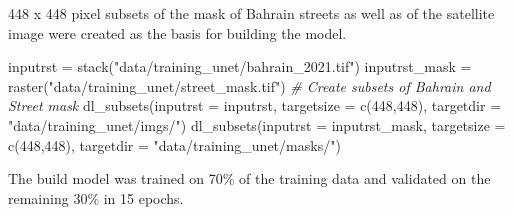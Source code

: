 \documentclass[
]{article}
\newenvironment{Shaded}{\begin{snugshade}}{\end{snugshade}}
\newcommand{\AttributeTok}[1]{\textcolor[rgb]{0.77,0.63,0.00}{#1}}
\newcommand{\CommentTok}[1]{\textcolor[rgb]{0.56,0.35,0.01}{\textit{#1}}}
\newcommand{\ControlFlowTok}[1]{\textcolor[rgb]{0.13,0.29,0.53}{\textbf{#1}}}
\newcommand{\DecValTok}[1]{\textcolor[rgb]{0.00,0.00,0.81}{#1}}
\newcommand{\FunctionTok}[1]{\textcolor[rgb]{0.00,0.00,0.00}{#1}}
\newcommand{\NormalTok}[1]{#1}
\newcommand{\OtherTok}[1]{\textcolor[rgb]{0.56,0.35,0.01}{#1}}
\newcommand{\SpecialCharTok}[1]{\textcolor[rgb]{0.00,0.00,0.00}{#1}}
\newcommand{\StringTok}[1]{\textcolor[rgb]{0.31,0.60,0.02}{#1}}
\begin{document}
\begin{Shaded}
\end{Shaded}

448 x 448 pixel subsets of the mask of Bahrain streets as well as of the
satellite image were created as the basis for building the model.

\begin{Shaded}
\begin{Highlighting}[]
\NormalTok{inputrst }\OtherTok{=} \FunctionTok{stack}\NormalTok{(}\StringTok{"data/training\_unet/bahrain\_2021.tif"}\NormalTok{)}
\NormalTok{inputrst\_mask }\OtherTok{=} \FunctionTok{raster}\NormalTok{(}\StringTok{"data/training\_unet/street\_mask.tif"}\NormalTok{)}
\CommentTok{\# Create subsets of Bahrain and Street mask}
\FunctionTok{dl\_subsets}\NormalTok{(}\AttributeTok{inputrst =}\NormalTok{ inputrst, }\AttributeTok{targetsize =} \FunctionTok{c}\NormalTok{(}\DecValTok{448}\NormalTok{,}\DecValTok{448}\NormalTok{), }
           \AttributeTok{targetdir =} \StringTok{"data/training\_unet/imgs/"}\NormalTok{)}
\FunctionTok{dl\_subsets}\NormalTok{(}\AttributeTok{inputrst =}\NormalTok{ inputrst\_mask, }\AttributeTok{targetsize =} \FunctionTok{c}\NormalTok{(}\DecValTok{448}\NormalTok{,}\DecValTok{448}\NormalTok{), }
           \AttributeTok{targetdir =} \StringTok{"data/training\_unet/masks/"}\NormalTok{)}
\end{Highlighting}
\end{Shaded}

The build model was trained on 70\% of the training data and validated
on the remaining 30\% in 15 epochs.
\end{document}
